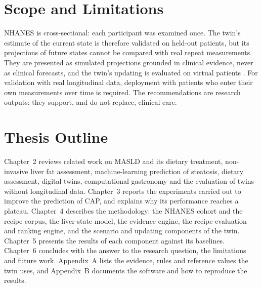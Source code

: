 \section{Scope and Limitations}
\label{sec:scope}
NHANES is cross-sectional: each participant was examined once. The twin's
estimate of the current state is therefore validated on held-out patients,
but its projections of future states cannot be compared with real repeat
measurements. They are presented as simulated projections grounded in
clinical evidence, never as clinical forecasts, and the twin's updating is
evaluated on virtual patients \cite{pappalardo2019insilico,franklin2014plasmode}.
For validation with real longitudinal data, deployment with patients who enter
their own measurements over time is required. The recommendations are research
outputs: they support, and do not replace, clinical care.

\section{Thesis Outline}
\label{sec:outline}
Chapter~2 reviews related work on MASLD and its dietary treatment,
non-invasive liver fat assessment, machine-learning prediction of steatosis,
dietary assessment, digital twins, computational gastronomy and the
evaluation of twins without longitudinal data. Chapter~3 reports the
experiments carried out to improve the prediction of CAP, and explains why
its performance reaches a plateau. Chapter~4 describes the
methodology: the NHANES cohort and the recipe corpus, the liver-state model,
the evidence engine, the recipe evaluation and ranking engine, and the
scenario and updating components of the twin. Chapter~5 presents the results of each
component against its baselines. Chapter~6 concludes with the answer to the
research question, the limitations and future work. Appendix~A lists the
evidence, rules and reference values the twin uses, and Appendix~B documents
the software and how to reproduce the results.
